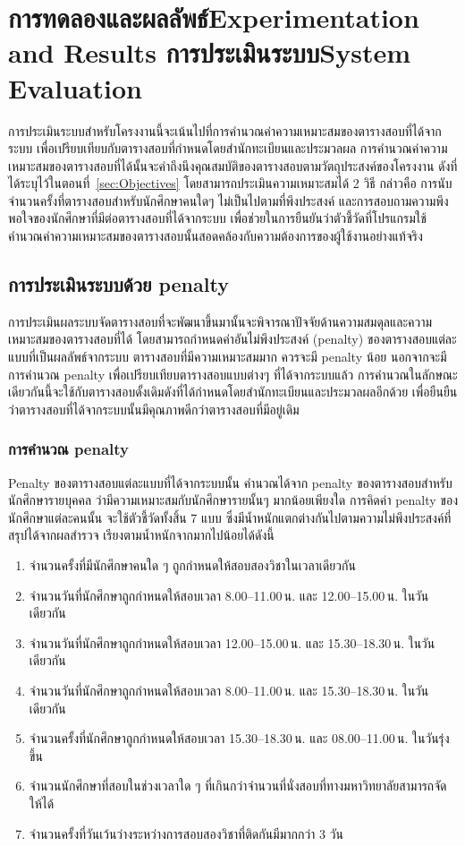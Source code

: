 \chapter{\ifproject%
\ifcpe การทดลองและผลลัพธ์\else Experimentation and Results\fi
\else%
\ifcpe การประเมินระบบ\else System Evaluation\fi
\fi}

การประเมินระบบสำหรับโครงงานนี้จะเน้นไปที่การคำนวณค่าความเหมาะสมของตารางสอบที่ได้จากระบบ เพื่อเปรียบเทียบกับตารางสอบที่กำหนดโดยสำนักทะเบียนและประมวลผล 
\enskip การคำนวณค่าความเหมาะสมของตารางสอบที่ได้นั้นจะคำถึงนึงคุณสมบัติของตารางสอบตามวัตถุประสงค์ของโครงงาน ดังที่ได้ระบุไว้ในตอนที่~\ref{sec:Objectives} 
โดยสามารถประเมินความเหมาะสมได้ 2 วิธี กล่าวคือ การนับจำนวนครั้งที่ตารางสอบสำหรับนักศึกษาคนใดๆ ไม่เป็นไปตามที่พึงประสงค์ และการสอบถามความพึงพอใจของนักศึกษาที่มีต่อตารางสอบที่ได้จากระบบ เพื่อช่วยในการยืนยันว่าตัวชี้วัดที่โปรแกรมใช้คำนวณค่าความเหมาะสมของตารางสอบนั้นสอดคล้องกับความต้องการของผู้ใช้งานอย่างแท้จริง

\section{การประเมินระบบด้วย penalty}
การประเมินผลระบบจัดตารางสอบที่จะพัฒนาขึ้นมานั้นจะพิจารณาปัจจัยด้านความสมดุลและความเหมาะสมของตารางสอบที่ได้ โดยสามารถกำหนดค่าอันไม่พึงประสงค์ (penalty) ของตารางสอบแต่ละแบบที่เป็นผลลัพธ์จากระบบ
\enskip ตารางสอบที่มีความเหมาะสมมาก ควรจะมี penalty น้อย
\enskip นอกจากจะมีการคำนวณ penalty เพื่อเปรียบเทียบตารางสอบแบบต่างๆ ที่ได้จากระบบแล้ว การคำนวณในลักษณะเดียวกันนี้จะใช้กับตารางสอบดั้งเดิมดังที่ได้กำหนดโดยสำนักทะเบียนและประมวลผลอีกด้วย เพื่อยืนยืนว่าตารางสอบที่ได้จากระบบนั้นมีคุณภาพดีกว่าตารางสอบที่มีอยู่เดิม

\subsection{การคำนวณ penalty}
Penalty ของตารางสอบแต่ละแบบที่ได้จากระบบนั้น คำนวณได้จาก penalty ของตารางสอบสำหรับนักศึกษารายบุคคล ว่ามีความเหมาะสมกับนักศึกษารายนั้นๆ มากน้อยเพียงใด \enskip 
การคิดค่า penalty ของนักศึกษาแต่ละคนนั้น จะใช้ตัวชี้วัดทั้งสิ้น 7 แบบ ซึ่งมีน้ำหนักแตกต่างกันไปตามความไม่พึงประสงค์ที่สรุปได้จากผลสำรวจ เรียงตามน้ำหนักจากมากไปน้อยได้ดังนี้
\begin{enumerate}
    \item จำนวนครั้งที่มีนักศึกษาคนใด ๆ ถูกกำหนดให้สอบสองวิชาในเวลาเดียวกัน
    \item จำนวนวันที่นักศึกษาถูกกำหนดให้สอบเวลา 8.00--11.00\,น. และ 12.00--15.00\,น. ในวันเดียวกัน
    \item จำนวนวันที่นักศึกษาถูกกำหนดให้สอบเวลา 12.00--15.00\,น. และ 15.30--18.30\,น. ในวันเดียวกัน
    \item จำนวนวันที่นักศึกษาถูกกำหนดให้สอบเวลา 8.00--11.00\,น. และ 15.30--18.30\,น. ในวันเดียวกัน
    \item จำนวนครั้งที่นักศึกษาถูกกำหนดให้สอบเวลา 15.30--18.30\,น. และ 08.00--11.00\,น. ในวันรุ่งขึ้น
    \item จำนวนนักศึกษาที่สอบในช่วงเวลาใด ๆ ที่เกินกว่าจํานวนที่นั่งสอบที่ทางมหาวิทยาลัยสามารถจัดให้ได้
    \item จำนวนครั้งที่วันเว้นว่างระหว่างการสอบสองวิชาที่ติดกันมีมากกว่า 3 วัน
\end{enumerate}

